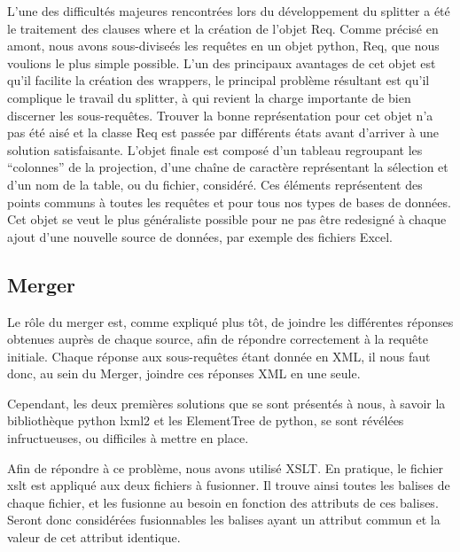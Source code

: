 L’une des difficultés majeures rencontrées lors du développement du splitter a été le traitement des clauses where et la création de l’objet Req. Comme précisé en amont, nous avons sous-diviseés les requêtes en un objet python, Req, que nous voulions le plus simple possible. L’un des principaux avantages de cet objet est qu’il facilite la création des wrappers, le principal problème résultant est qu’il complique le travail du splitter, à qui revient la charge importante de bien discerner les sous-requêtes. Trouver la bonne représentation pour cet objet n’a pas été aisé et la classe Req est passée par différents états avant d’arriver à une solution satisfaisante. L’objet finale est composé d’un tableau regroupant les “colonnes” de la projection, d’une chaîne de caractère représentant la sélection et d’un nom de la table, ou du fichier, considéré. Ces éléments représentent des points communs à toutes les requêtes et pour tous nos types de bases de données. Cet objet se veut le plus généraliste possible pour ne pas être redesigné à chaque ajout d’une nouvelle source de données, par exemple des fichiers Excel.

\subsection{Merger}

Le rôle du merger est, comme expliqué plus tôt, de joindre les différentes réponses obtenues auprès de chaque source, afin de répondre correctement à la requête initiale. Chaque réponse aux sous-requêtes étant donnée en XML, il nous faut donc, au sein du Merger, joindre ces réponses XML en une seule.

Cependant, les deux premières solutions que se sont présentés à nous, à savoir la bibliothèque python lxml2 et les ElementTree de python, se sont révélées infructueuses, ou difficiles à mettre en place.

Afin de répondre à ce problème, nous avons utilisé XSLT. En pratique, le fichier xslt est appliqué aux deux fichiers à fusionner. Il trouve ainsi toutes les balises de chaque fichier, et les fusionne au besoin en fonction des attributs de ces balises. Seront donc considérées fusionnables les balises ayant un attribut commun et la valeur de cet attribut identique.

